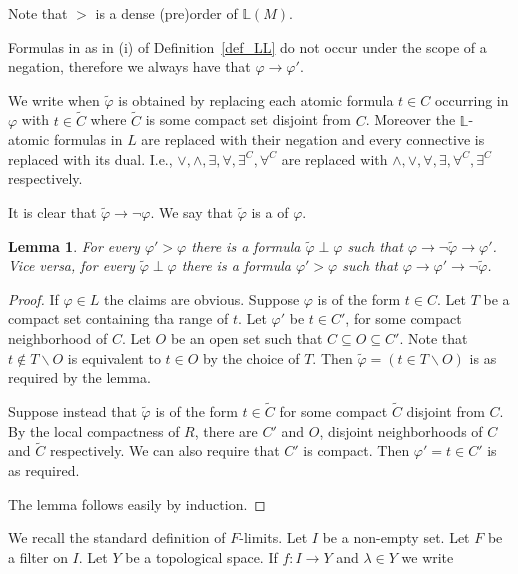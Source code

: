 \documentclass[11pt,oneside]{amsart}
\theoremstyle{plain}
\newtheorem{lemma}[theorem]{Lemma}
\theoremstyle{remark}
\renewcommand*{\emph}[1]{%
   \smash{\tikz[baseline]\node[rectangle, fill=olive!25, rounded corners, inner xsep=0.5ex, inner ysep=0.2ex, anchor=base, minimum height = 2.7ex]{#1};}}
\begin{document}
Note that $>$ is a dense (pre)order of $\mathds{L}(M)$.

Formulas in as in (i) of Definition~\ref{def_LL} do not occur under the scope of a negation, therefore we always have that $\varphi\to\varphi'$.

We write \emph{$\tilde{\varphi}\perp\varphi$\/} when $\tilde{\varphi}$ is obtained by replacing each atomic formula $t\in C$ occurring in $\varphi$ with $t\in\tilde{C}$ where $\tilde{C}$ is some compact set disjoint from $C$. 
Moreover the $\mathds{L}$-atomic formulas in $L$ are replaced with their negation and every connective is replaced with its dual.
I.e., $\vee, \wedge, \exists, \forall, \exists^C, \forall^C$ are replaced with $\wedge,\vee,\forall,\exists,\forall^C,\exists^C$ respectively.

It is clear that $\tilde{\varphi}\rightarrow\neg\varphi$.
We say that  $\tilde{\varphi}$ is a \emph{strong negation} of $\varphi$.


\begin{lemma}\label{lem_interpolation}
  For every $\varphi'>\varphi$ there is a formula $\tilde{\varphi}\perp\varphi$ such that $\varphi\rightarrow\neg \tilde{\varphi}\rightarrow\varphi'$. 
  Vice versa, for every $\tilde{\varphi}\perp\varphi$ there is a formula $\varphi'>\varphi$ such that  $\varphi\rightarrow\varphi'\rightarrow\neg \tilde{\varphi}$.
\end{lemma}

\begin{proof}
  If $\varphi\in L$ the claims are obvious.
  Suppose $\varphi$ is of the form $t\in C$.
  Let $T$ be a compact set containing tha range of $t$.
  Let $\varphi'$ be $t\in C'$, for some compact neighborhood of $C$.
  Let $O$ be an open set such that $C\subseteq O\subseteq C'$.
  Note that $t\notin  T\smallsetminus O$ is equivalent to $t\in O$ by the choice of $T$.
  Then $\tilde{\varphi}=(t\in T\smallsetminus O)$ is as required by the lemma.
  
  Suppose instead that $\tilde{\varphi}$ is of the form $t\in\tilde{C}$ for some compact $\tilde{C}$ disjoint from $C$.
  By the local compactness of $R$, there are $C'$ and $O$, disjoint neighborhoods of $C$ and $\tilde{C}$ respectively.
  We can also require that $C'$ is compact.
  Then  $\varphi'=t\in C'$ is as required.

  The lemma follows easily by induction.
\end{proof}

We recall the standard definition of $F$-limits.
Let $I$ be a non-empty set.
Let $F$ be a filter on $I$.
Let $Y$ be a topological space.
If $f:I\to Y$ and $\lambda\in Y$ we write
\end{document}
